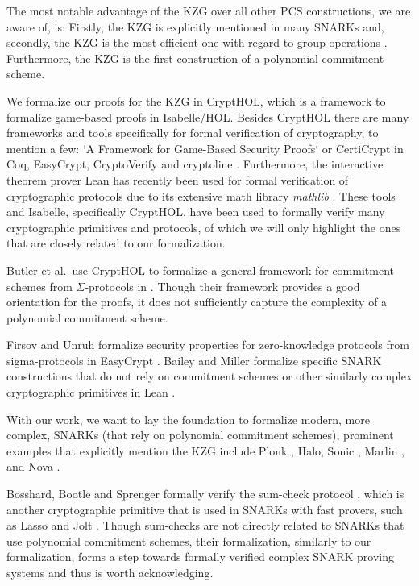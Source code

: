 The most notable advantage of the KZG over all other PCS constructions, we are aware of, is: Firstly, the KZG is explicitly mentioned in many SNARKs \parencite{plonk,sonic,marlin,halo,nova} and, secondly, the KZG is the most efficient one with regard to group operations \parencite{Dory}. 
Furthermore, the KZG is the first construction of a polynomial commitment scheme. 

We formalize our proofs for the KZG in CryptHOL\parencite{CryptHOL-AFP}, which is a framework to formalize game-based proofs in Isabelle/HOL.
Besides CryptHOL there are many frameworks and tools specifically for formal verification of cryptography, to mention a few: `A Framework for Game-Based Security Proofs` \parencite{game_based_coq} or CertiCrypt \parencite{crypto_coq} in Coq\parencite{Coq}, EasyCrypt\parencite{EasyCrypt}, CryptoVerify\parencite{CryptoVerif} and cryptoline \parencite{Cryptoline}. Furthermore, the interactive theorem prover Lean\parencite{Lean} has recently been used for formal verification of cryptographic protocols due to its extensive math library \textit{mathlib} \parencite{Lean_groth16}.
These tools and Isabelle, specifically CryptHOL, have been used to formally verify many cryptographic primitives and protocols, of which we will only highlight the ones that are closely related to our formalization.

Butler et al.\ use CryptHOL to formalize a general framework for commitment schemes from $\Sigma$-protocols in \parencite{sigma_commit_crypto}. Though their framework provides a good orientation for the proofs, it does not sufficiently capture the complexity of a polynomial commitment scheme.

Firsov and Unruh formalize security properties for zero-knowledge protocols from sigma-protocols in EasyCrypt \parencite{zk_easycrypt}.
Bailey and Miller formalize specific SNARK constructions that do not rely on commitment schemes or other similarly complex cryptographic primitives in Lean \parencite{Lean_groth16}. 

With our work, we want to lay the foundation to formalize modern, more complex, SNARKs (that rely on polynomial commitment schemes), prominent examples that explicitly mention the KZG include Plonk \parencite{plonk}, Halo\parencite{halo}, Sonic \parencite{sonic}, Marlin \parencite{marlin}, and Nova \parencite{nova}.

Bosshard, Bootle and Sprenger formally verify the sum-check protocol \parencite{sumcheck_Isabelle}, which is another cryptographic primitive that is used in SNARKs with fast provers, such as Lasso and Jolt \parencite{Lasso, jolt}. Though sum-checks are not directly related to SNARKs that use polynomial commitment schemes, their formalization, similarly to our formalization, forms a step towards formally verified complex SNARK proving systems and thus is worth acknowledging.


